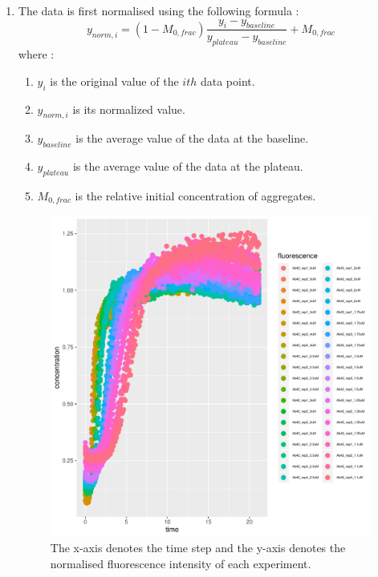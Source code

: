 \documentclass[11pt,a4paper]{article}
\begin{document}
\begin{enumerate}
  \item The data is first normalised using the following formula  :
  \[ y_{norm,i} = (1 - M_{0,frac}) \frac{y_{i} - y_{baseline}}{y_{plateau} - y_{baseline}} + M_{0,frac} \] where :
  \begin{enumerate}
    \item $y_i$ is the original value of the $ith$ data point.
    \item $y_{norm,i}$ is its normalized value.
    \item $y_{baseline}$ is the average value of the data at the baseline.
    \item $y_{plateau}$ is the average value of the data at the plateau.
    \item $M_{0,frac}$  is the relative initial concentration of aggregates.
  \end{enumerate}

    \begin{figure}[H]
    \centering
    \includegraphics[width=1\textwidth]{Images/normalised.pdf}
    \caption{The x-axis denotes the time step and the y-axis denotes the normalised fluorescence intensity of each experiment.}
    \label{fig: sample trajectory}
    \end{figure}


\end{enumerate}
\end{document}
